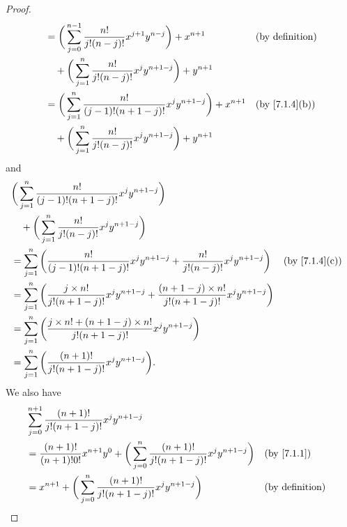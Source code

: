\begin{proof}
\begin{align*}
                    & = \bigg(\sum_{j = 0}^{n - 1} \dfrac{n!}{j!(n - j)!} x^{j + 1} y^{n - j}\bigg) + x^{n + 1}   &  & \text{(by definition)}      \\
                    & \quad + \bigg(\sum_{j = 1}^n \dfrac{n!}{j!(n - j)!} x^j y^{n + 1 - j}\bigg) + y^{n + 1}                                      \\
                    & = \bigg(\sum_{j = 1}^n \dfrac{n!}{(j - 1)!(n + 1 - j)!} x^j y^{n + 1 - j}\bigg) + x^{n + 1} &  & \text{(by \cref{7.1.4}(b))} \\
                    & \quad + \bigg(\sum_{j = 1}^n \dfrac{n!}{j!(n - j)!} x^j y^{n + 1 - j}\bigg) + y^{n + 1}
  \end{align*}
  and
  \begin{align*}
     & \bigg(\sum_{j = 1}^n \dfrac{n!}{(j - 1)!(n + 1 - j)!} x^j y^{n + 1 - j}\bigg)                                                                                                         \\
     & \quad + \bigg(\sum_{j = 1}^n \dfrac{n!}{j!(n - j)!} x^j y^{n + 1 - j}\bigg)                                                                                                           \\
     & = \sum_{j = 1}^n \bigg(\dfrac{n!}{(j - 1)!(n + 1 - j)!} x^j y^{n + 1 - j} + \dfrac{n!}{j!(n - j)!} x^j y^{n + 1 - j}\bigg)                           &  & \text{(by \cref{7.1.4}(c))} \\
     & = \sum_{j = 1}^n \bigg(\dfrac{j \times n!}{j!(n + 1 - j)!} x^j y^{n + 1 - j} + \dfrac{(n + 1 - j) \times n!}{j!(n + 1 - j)!} x^j y^{n + 1 - j}\bigg)                                  \\
     & = \sum_{j = 1}^n \bigg(\dfrac{j \times n! + (n + 1 - j) \times n!}{j!(n + 1 - j)!} x^j y^{n + 1 - j}\bigg)                                                                            \\
     & = \sum_{j = 1}^n \bigg(\dfrac{(n + 1)!}{j!(n + 1 - j)!} x^j y^{n + 1 - j}\bigg).
  \end{align*}
  We also have
  \begin{align*}
     & \sum_{j = 0}^{n + 1} \dfrac{(n + 1)!}{j!(n + 1 - j)!} x^j y^{n + 1 - j}                                                                                        \\
     & = \dfrac{(n + 1)!}{(n + 1)! 0!} x^{n + 1} y^0 + \bigg(\sum_{j = 0}^n \dfrac{(n + 1)!}{j!(n + 1 - j)!} x^j y^{n + 1 - j}\bigg) &  & \by{7.1.1}                  \\
     & = x^{n + 1} + \bigg(\sum_{j = 0}^n \dfrac{(n + 1)!}{j!(n + 1 - j)!} x^j y^{n + 1 - j}\bigg)                                   &  & \text{(by definition)}      \\

\end{align*}
\end{proof}
